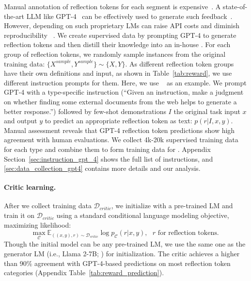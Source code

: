 Manual annotation of reflection tokens for each segment is expensive~\citep{wu2023fine}. 
A state-of-the-art LLM like GPT-4~\citep{openai2023gpt} can be effectively used to generate such feedback~\citep{liu2023gpteval}. 
However, depending on such proprietary LMs can raise API costs and diminish reproducibility%
~\citep{chen2023chatgpt}. 
We create supervised data by prompting GPT-4 to generate reflection tokens and then distill their knowledge into an in-house \mcrt. 
For each group of reflection tokens, we randomly sample instances from the original training data: $\{X^{sample}, Y^{sample}\} \sim \{X, Y\}$. 
{
As different reflection token groups have their own definitions and input, as shown in Table~\ref{tab:reward}, we use different instruction prompts for them. Here, we use \ret~ as an example. We prompt GPT-4 with a type-specific instruction (``Given an instruction, make a judgment on whether finding some external documents from the web helps to generate a better response.'') followed by few-shot demonstrations $I$ the original task input $x$ and output ${y}$ to predict an appropriate reflection token as text: $p(r|I, x, y)$.
Manual assessment reveals that GPT-4 reflection token predictions show high agreement with human evaluations.
We collect 4k-20k supervised training data for each type and combine them to form training data for \mcrt. 
Appendix Section~\ref{sec:instruction_gpt_4} shows the full list of instructions, and \ref{sec:data_collection_gpt4}} contains more details and our analysis.

\paragraph{Critic learning.}
After we collect training data $\mathcal{D}_{critic}$, we initialize \mcrt with a pre-trained LM %
and train it on $\mathcal{D}_{critic}$ using a standard conditional language modeling objective, maximizing likelihood:
\begin{equation}\label{eq:crt_training}
    \max_{\mathcal{C}}\mathbb{E}_{((x,y),r) \sim \mathcal{D}_{critic}} \log p_{\mathcal{C}} (r| x, y), \text{ 
$r$ for reflection tokens. }
\end{equation}
Though the initial model can be any pre-trained LM, we use the same one as the generator LM (i.e., Llama 2-7B; \citealt{touvron2023llama}) for \mcrt initialization. 
The critic achieves a higher than 90\% agreement with GPT-4-based predictions on most reflection token categories (Appendix Table~\ref{tab:reward_prediction}). 


